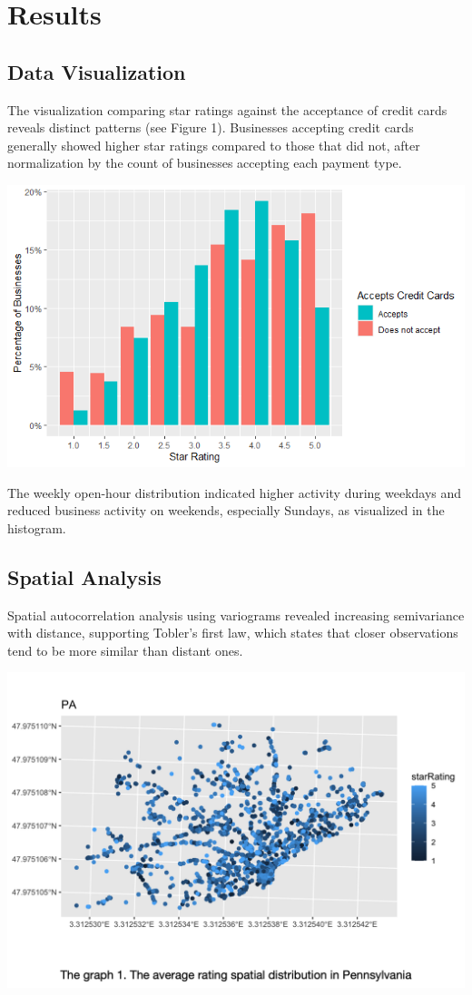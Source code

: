 \documentclass[
  12pt,
  letterpaper,
  DIV=11,
  numbers=noendperiod]{scrartcl}
\begin{document}
\section{Results}\label{results}

\subsection{Data Visualization}\label{data-visualization}

The visualization comparing star ratings against the acceptance of
credit cards reveals distinct patterns (see Figure 1). Businesses
accepting credit cards generally showed higher star ratings compared to
those that did not, after normalization by the count of businesses
accepting each payment type.

\includegraphics{figure1.png}

The weekly open-hour distribution indicated higher activity during
weekdays and reduced business activity on weekends, especially Sundays,
as visualized in the histogram.

\subsection{Spatial Analysis}\label{spatial-analysis}

Spatial autocorrelation analysis using variograms revealed increasing
semivariance with distance, supporting Tobler's first law, which states
that closer observations tend to be more similar than distant ones.

\includegraphics{figure2.png}
\end{document}
